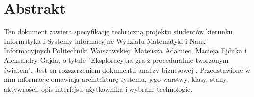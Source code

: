 \chapter{Abstrakt}

Ten dokument zawiera specyfikację techniczną projektu studentów kierunku Informatyka i Systemy Informacyjne Wydziału Matematyki i Nauk Informacyjnych Politechniki Warszawskiej: Mateusza Adamiec, Macieja Ejduka i Aleksandry Gajda, o tytule "Eksploracyjna gra z proceduralnie tworzonym światem". Jest on rozszerzeniem dokumentu analizy biznesowej \cite{dokumentacja}. Przedstawione w nim informacje omawiają architekturę systemu, jego warstwy, klasy, stany, aktywności, opis interfejsu użytkownika i wybrane technologie.


